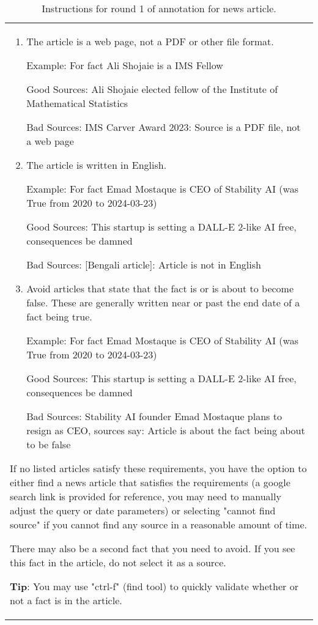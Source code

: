 \begin{table*}[]
\begin{tabular}{p{15cm}}
\begin{enumerate}
    \item The article is a web page, not a PDF or other file format.

    Example: For fact Ali Shojaie is a IMS Fellow

    Good Sources: Ali Shojaie elected fellow of the Institute of Mathematical Statistics 

    Bad Sources: IMS Carver Award 2023: Source is a PDF file, not a web page
    
    \item The article is written in English.

    Example: For fact Emad Mostaque is CEO of Stability AI (was True from 2020 to 2024-03-23)

    Good Sources: This startup is setting a DALL-E 2-like AI free, consequences be damned

    Bad Sources: [Bengali article]: Article is not in English
    
    \item Avoid articles that state that the fact is or is about to become false. These are generally written near or past the end date of a fact being true.

    Example: For fact Emad Mostaque is CEO of Stability AI (was True from 2020 to 2024-03-23)

    Good Sources: This startup is setting a DALL-E 2-like AI free, consequences be damned

    Bad Sources: Stability AI founder Emad Mostaque plans to resign as CEO, sources say: Article is about the fact being about to be false
    \end{enumerate}

If no listed articles satisfy these requirements, you have the option to either find a news article that satisfies the requirements (a google search link is provided for reference, you may need to manually adjust the query or date parameters) or selecting "cannot find source" if you cannot find any source in a reasonable amount of time.

There may also be a second fact that you need to avoid. If you see this fact in the article, do not select it as a source.

\textbf{Tip}: You may use "ctrl-f" (find tool) to quickly validate whether or not a fact is in the article.
    \end{tabular}
    \caption{Instructions for round 1 of annotation for news article.}
    \label{tab:annotator_instructions_1}
\end{table*}

